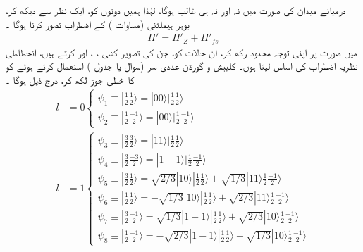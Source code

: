 درمیانے میدان کی صورت میں  نہ   اور نہ ہی  غالب ہوگا،  لہٰذا  ہمیں دونوں کو،  ایک نظر سے دیکھ کر،  بوہر ہیملٹنی (مساوات ) کے اضطراب تصور کرنا ہوگا ۔
\begin{align}
H' = H'_Z + H'_{fs}
\end{align}
میں  صورت پر اپنی توجہ محدود رکھ کر،  ان  حالات کو، جن کی تصویر کشی  ، ، اور   کرتے ہیں،    انحطاطی نظریہ اضطراب کی  اساس لیتا ہوں۔  کلیبش و  گورڈن عددی سر (سوال  یا جدول  )  استعمال کرتے   ہوئے  کو  کا خطی جوڑ لکھ کر،  درج ذیل ہوگا ۔
\begin{align*}
l &= 0
\begin{cases}
\psi_1 \equiv | \frac{1}{2} \frac{1}{2} \rangle = | 00 \rangle | \frac{1}{2} \frac{1}{2} \rangle \\
\psi_2 \equiv | \frac{1}{2} \frac{-1}{2} \rangle = | 00 \rangle | \frac{1}{2} \frac{-1}{2} \rangle
\end{cases} \\
l &= 1
\begin{cases}
\psi_3 \equiv | \frac{3}{2} \frac{3}{2} \rangle = | 11 \rangle | \frac{1}{2} \frac{1}{2} \rangle \\
\psi_4 \equiv | \frac{3}{2} \frac{-3}{2} \rangle = | 1 - 1 \rangle | \frac{1}{2} \frac{-1}{2} \rangle \\
\psi_5 \equiv | \frac{3}{2} \frac{1}{2} \rangle = \sqrt{2/3}| 10 \rangle | \frac{1}{2} \frac{1}{2} \rangle + \sqrt{1/3} | 11 \rangle \frac{1}{2} \frac{-1}{2} \rangle \\
\psi_6 \equiv | \frac{1}{2} \frac{1}{2} \rangle = - \sqrt{1/3} | 10 \rangle | \frac{1}{2} \frac{1}{2} \rangle + \sqrt{2/3} | 11 \rangle \frac{1}{2} \frac{-1}{2} \rangle \\
\psi_7 \equiv | \frac{3}{2} \frac{-1}{2} \rangle = \sqrt{1/3} | 1 - 1 \rangle | \frac{1}{2} \frac{1}{2} \rangle + \sqrt{2/3} | 10 \rangle \frac{1}{2} \frac{-1}{2} \rangle \\
\psi_8 \equiv | \frac{1}{2} \frac{-1}{2} \rangle = - \sqrt{2/3} | 1 - 1 \rangle | \frac{1}{2} \frac{1}{2} \rangle + \sqrt{1/3} | 10 \rangle \frac{1}{2} \frac{-1}{2} \rangle
\end{cases}
\end{align*}

